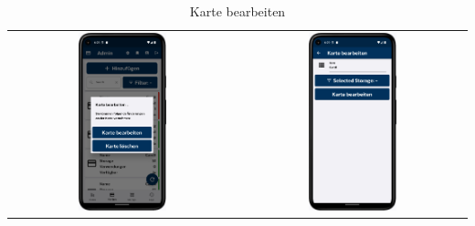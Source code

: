 \vspace{1cm}
\begin{table}[htbp]
  \centering
  \begin{tabular}{cc}
    \includegraphics[width=0.4\textwidth]{FLUTTER/images/ZB/card_page_selector.png} &
    \includegraphics[width=0.4\textwidth]{FLUTTER/images/ZB/card_alter_page.png} \\
  \end{tabular}
  \label{tab:example}
  \captionsetup{type=figure}
  \caption{Karte bearbeiten}
\end{table}

